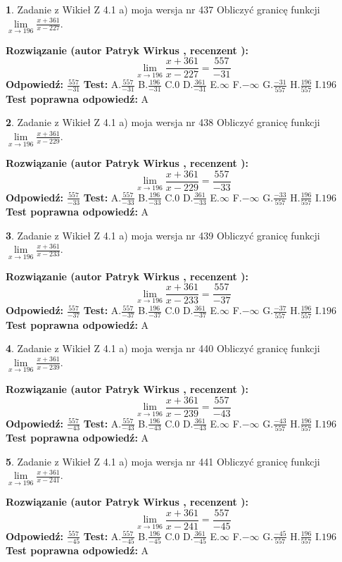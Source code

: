 \documentclass[12pt, a4paper]{article}
\theoremstyle{definition} %
\newtheorem{zad}{}
\newcommand{\zadStart}[1]{\begin{zad}#1\newline}
\newcommand{\zadStop}{\end{zad}}
\newcommand{\rozwStart}[2]{\noindent \textbf{Rozwiązanie (autor #1 , recenzent #2): }\newline}
\newcommand{\rozwStop}{\newline}
\newcommand{\odpStart}{\noindent \textbf{Odpowiedź:}\newline}
\newcommand{\odpStop}{\newline}
\newcommand{\testStart}{\noindent \textbf{Test:}\newline}
\newcommand{\testStop}{\newline}
\newcommand{\kluczStart}{\noindent \textbf{Test poprawna odpowiedź:}\newline}
\newcommand{\kluczStop}{\newline}
\begin{document}
\zadStart{Zadanie z Wikieł Z 4.1 a) moja wersja nr 437}
Obliczyć granicę funkcji $\lim\limits_{x\to196}\frac{x+361}{x-227}$.
\zadStop
\rozwStart{Patryk Wirkus}{}
$$\lim\limits_{x\to196}\frac{x+361}{x-227} = \frac{557}{-31}$$
\rozwStop
\odpStart
$\frac{557}{-31}$
\odpStop
\testStart
A.$\frac{557}{-31}$
B.$\frac{196}{-31}$
C.$0$
D.$\frac{361}{-31}$
E.$\infty$
F.$-\infty$
G.$\frac{-31}{557}$
H.$\frac{196}{557}$
I.$196$
\testStop
\kluczStart
A
\kluczStop



\zadStart{Zadanie z Wikieł Z 4.1 a) moja wersja nr 438}
Obliczyć granicę funkcji $\lim\limits_{x\to196}\frac{x+361}{x-229}$.
\zadStop
\rozwStart{Patryk Wirkus}{}
$$\lim\limits_{x\to196}\frac{x+361}{x-229} = \frac{557}{-33}$$
\rozwStop
\odpStart
$\frac{557}{-33}$
\odpStop
\testStart
A.$\frac{557}{-33}$
B.$\frac{196}{-33}$
C.$0$
D.$\frac{361}{-33}$
E.$\infty$
F.$-\infty$
G.$\frac{-33}{557}$
H.$\frac{196}{557}$
I.$196$
\testStop
\kluczStart
A
\kluczStop



\zadStart{Zadanie z Wikieł Z 4.1 a) moja wersja nr 439}
Obliczyć granicę funkcji $\lim\limits_{x\to196}\frac{x+361}{x-233}$.
\zadStop
\rozwStart{Patryk Wirkus}{}
$$\lim\limits_{x\to196}\frac{x+361}{x-233} = \frac{557}{-37}$$
\rozwStop
\odpStart
$\frac{557}{-37}$
\odpStop
\testStart
A.$\frac{557}{-37}$
B.$\frac{196}{-37}$
C.$0$
D.$\frac{361}{-37}$
E.$\infty$
F.$-\infty$
G.$\frac{-37}{557}$
H.$\frac{196}{557}$
I.$196$
\testStop
\kluczStart
A
\kluczStop



\zadStart{Zadanie z Wikieł Z 4.1 a) moja wersja nr 440}
Obliczyć granicę funkcji $\lim\limits_{x\to196}\frac{x+361}{x-239}$.
\zadStop
\rozwStart{Patryk Wirkus}{}
$$\lim\limits_{x\to196}\frac{x+361}{x-239} = \frac{557}{-43}$$
\rozwStop
\odpStart
$\frac{557}{-43}$
\odpStop
\testStart
A.$\frac{557}{-43}$
B.$\frac{196}{-43}$
C.$0$
D.$\frac{361}{-43}$
E.$\infty$
F.$-\infty$
G.$\frac{-43}{557}$
H.$\frac{196}{557}$
I.$196$
\testStop
\kluczStart
A
\kluczStop



\zadStart{Zadanie z Wikieł Z 4.1 a) moja wersja nr 441}
Obliczyć granicę funkcji $\lim\limits_{x\to196}\frac{x+361}{x-241}$.
\zadStop
\rozwStart{Patryk Wirkus}{}
$$\lim\limits_{x\to196}\frac{x+361}{x-241} = \frac{557}{-45}$$
\rozwStop
\odpStart
$\frac{557}{-45}$
\odpStop
\testStart
A.$\frac{557}{-45}$
B.$\frac{196}{-45}$
C.$0$
D.$\frac{361}{-45}$
E.$\infty$
F.$-\infty$
G.$\frac{-45}{557}$
H.$\frac{196}{557}$
I.$196$
\testStop
\kluczStart
A
\kluczStop
\end{document}

